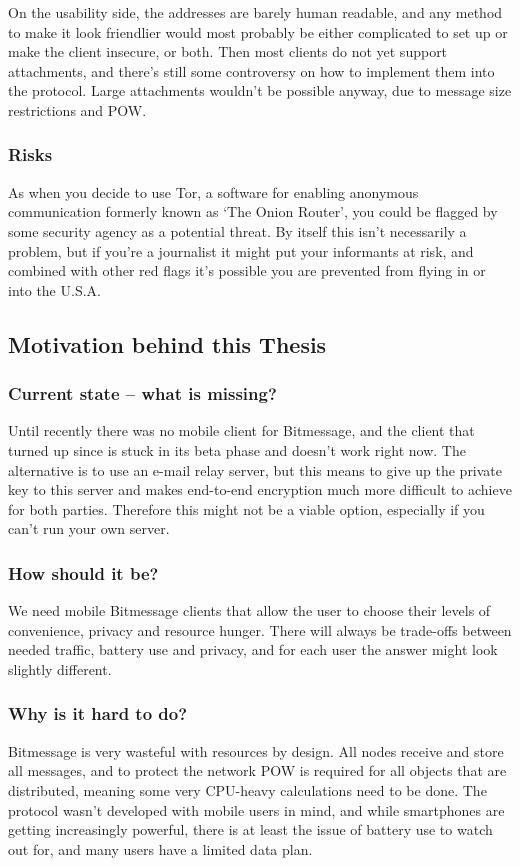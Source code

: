 \documentclass{bfh}
\begin{document}
  On the usability side, the addresses are barely human readable, and any method to make it look friendlier would most probably be either complicated to set up or make the client insecure, or both. Then most clients do not yet support attachments, and there's still some controversy on how to implement them into the protocol. Large attachments wouldn't be possible anyway, due to message size restrictions and \ac{POW}.

  \subsubsection{Risks}
  As when you decide to use Tor, a software for enabling anonymous communication formerly known as `The Onion Router', you could be flagged by some security agency as a potential threat.\cite{wired:tor} By itself this isn't necessarily a problem, but if you're a journalist it might put your informants at risk, and combined with other red flags it's possible you are prevented from flying in or into the U.S.A.


  \subsection{Motivation behind this Thesis}
  \subsubsection{Current state -- what is missing?}
  Until recently there was no mobile client for Bitmessage, and the client that turned up since is stuck in its beta phase and doesn't work right now. The alternative is to use an e-mail relay server, but this means to give up the private key to this server and makes end-to-end encryption much more difficult to achieve for both parties. Therefore this might not be a viable option, especially if you can't run your own server.

  \subsubsection{How should it be?}
  We need mobile Bitmessage clients that allow the user to choose their levels of convenience, privacy and resource hunger. There will always be trade-offs between needed traffic, battery use and privacy, and for each user the answer might look slightly different.

  \subsubsection{Why is it hard to do?}
  Bitmessage is very wasteful with resources by design. All nodes receive and store all messages, and to protect the network \ac{POW} is required for all objects that are distributed, meaning some very \acs{CPU}-heavy calculations need to be done. The protocol wasn't developed with mobile users in mind, and while smartphones are getting increasingly powerful, there is at least the issue of battery use to watch out for, and many users have a limited data plan.
\end{document}
